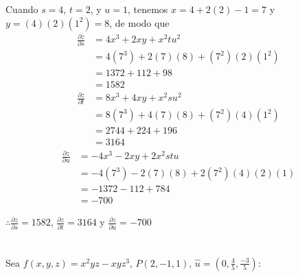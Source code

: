 \documentclass[12pt]{article}
\begin{document}
Cuando $s=4$, $t=2$, y $u=1$, tenemos $x=4+2(2)-1=7$ y $y=(4)(2)(1^2)=8$, de modo que
\begin{align*}
  \frac{\partial z}{\partial s}
  &= 4x^3+2xy + x^2tu^2 \\
  &= 4(7^3)+2(7)(8)+(7^2)(2)(1^2) \\
  &= 1372 + 112 + 98 \\
  &= 1582 
\end{align*}
\begin{align*}
  \frac{\partial z}{\partial t}
  &= 8x^3 + 4xy + x^2su^2 \\
  &= 8(7^3) + 4(7)(8) + (7^2)(4)(1^2) \\
  &= 2744 + 224 + 196 \\
  &=3164
\end{align*}
\begin{align*}
  \frac{\partial z}{\partial u}
  &= -4x^3 - 2xy + 2x^2stu \\
  &= -4(7^3) - 2(7)(8) + 2(7^2)(4)(2)(1) \\
  &= -1372 - 112 + 784 \\
  &= -700
\end{align*}

$\therefore \frac{\partial z}{\partial s}=1582$, $\frac{\partial z}{\partial t} = 3164$ y $ \frac{\partial z}{\partial u} = -700$

\section{}

Sea $f(x, y, z) = x^2yz - xyz^3$, $P(2, -1, 1)$, $\hat{u} = \left (0,\frac{4}{5},\frac{-3}{5} \right)$:
\end{document}
